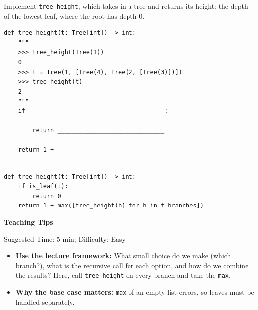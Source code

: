 \begin{blocksection}
\question Implement \lstinline{tree_height}, which takes in a tree and returns its height: the depth of the lowest leaf, where the root has depth 0.

\begin{lstlisting}
def tree_height(t: Tree[int]) -> int:
    """
    >>> tree_height(Tree(1))
    0
    >>> t = Tree(1, [Tree(4), Tree(2, [Tree(3)])])
    >>> tree_height(t)
    2
    """
    if ______________________________________:

        return ______________________________

    return 1 + ________________________________________________________
\end{lstlisting}
\begin{solution}[1in]
\begin{lstlisting}
def tree_height(t: Tree[int]) -> int:
    if is_leaf(t):
        return 0
    return 1 + max([tree_height(b) for b in t.branches])
\end{lstlisting}
\end{solution}
\end{blocksection}

\begin{questionmeta}
\textbf{Teaching Tips}\par\nopagebreak[4]
Suggested Time: 5 min; Difficulty: Easy
\nopagebreak[4]
\begin{itemize}
    \item \textbf{Use the lecture framework:} What small choice do we make (which branch?), what is the recursive call for each option, and how do we combine the results? Here, call \lstinline{tree_height} on every branch and take the \lstinline{max}.
    \item \textbf{Why the base case matters:} \lstinline{max} of an empty list errors, so leaves must be handled separately.
\end{itemize}
\end{questionmeta}
